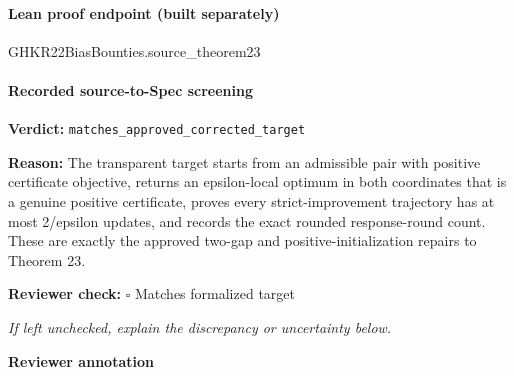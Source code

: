 \documentclass[10pt]{article}
\newcommand{\reviewerbox}{%
  \par\noindent\fbox{\parbox{0.96\linewidth}{\rule{0pt}{0.38in}}}\par
}
\newcommand{\reviewmatch}[1]{%
  \par\noindent\textbf{Reviewer check:} $\square$\; #1\par
  \noindent\emph{If left unchecked, explain the discrepancy or uncertainty below.}\par
}
\begin{document}
\paragraph{Lean proof endpoint (built separately)}\begin{ReviewVerbatim}
GHKR22BiasBounties.source_theorem23
\end{ReviewVerbatim}

\paragraph{Recorded source-to-Spec screening}
\textbf{Verdict:} \texttt{matches\_approved\_corrected\_target}
\\
{\raggedright
\textbf{Reason:} The transparent target starts from an admissible pair with positive certificate objective, returns an epsilon-\allowbreak{}local optimum in both coordinates that is a genuine positive certificate, proves every strict-\allowbreak{}improvement trajectory has at most 2/\allowbreak{}epsilon updates, and records the exact rounded response-\allowbreak{}round count.\allowbreak{} These are exactly the approved two-\allowbreak{}gap and positive-\allowbreak{}initialization repairs to Theorem 23.\allowbreak{}
\par}
\reviewmatch{Matches formalized target}
\noindent\textbf{Reviewer annotation}\par
\reviewerbox
\end{document}
